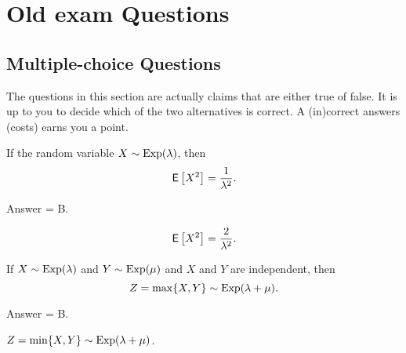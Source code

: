 \section{Old exam Questions}

\subsection{Multiple-choice Questions}

The questions in this section are actually claims that are either true of false.
It is up to you to decide which of the two alternatives is correct.
A (in)correct answers (costs) earns you a point.

\begin{exercise}[201703] 
 If the random variable $X\sim\operatorname{Exp}(\lambda)$, then
 \begin{equation*}
 \,\mathsf{E}\left[X^2\right]= \frac{1}{\lambda^2}.
 \end{equation*}
\begin{solution}
 Answer = B.

 \begin{equation*}
 \,\mathsf{E}\left[X^2\right]= \frac{2}{\lambda^2}.
 \end{equation*}

\end{solution}
\end{exercise}

\begin{exercise}[201703]
 If $X\sim\operatorname{Exp}(\lambda)$ and $Y\sim\operatorname{Exp}(\mu)$ and $X$ and $Y$ are
 independent, then
 \begin{equation*}
Z=\max\{X,Y\}\sim\operatorname{Exp}(\lambda+\mu).
 \end{equation*}
\begin{solution}
 Answer = B.

$Z=\min\{X,Y\} \sim \operatorname{Exp}(\lambda+\mu)$.

\end{solution}
\end{exercise}

